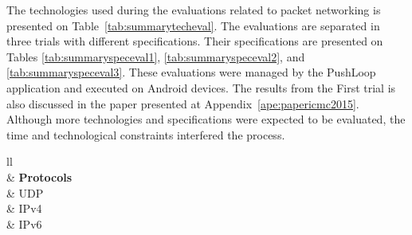 The technologies used during the evaluations related to packet networking is presented on Table~\ref{tab:summarytecheval}.
The evaluations are separated in three trials with different specifications.
Their specifications are presented on Tables \ref{tab:summaryspeceval1}, \ref{tab:summaryspeceval2}, and \ref{tab:summaryspeceval3}.
These evaluations were managed by the PushLoop application and executed on Android devices.
The results from the First trial is also discussed in the paper presented at Appendix~\ref{ape:papericmc2015}.
Although more technologies and specifications were expected to be evaluated, the time and technological constraints interfered the process.

\begin{table}[!ht]
	\centering
	\begin{tabular}{ll}
		                                                                               \\
		 & \textbf{Protocols} \\ \hline
		                                                           & UDP       \\ \hline
		                                                                  & IPv4      \\ \hline
		                                                               & IPv6      \\ \hline
	\end{tabular}
	\caption{Summary of Network technologies evaluated in Chapter~\ref{cap:evaluations}.}
	\label{tab:summarytecheval}
\end{table}


